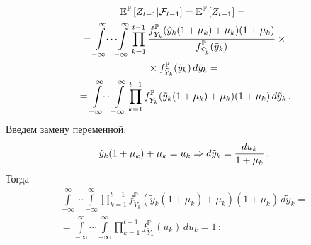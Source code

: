 \begin{multicols}{2}
\vspace{-12pt}

\noindent
\begin{multline*}
\mathbb{E}^{\mathbb{P}}\left[ Z_{t-1}\vert \mathcal{F}_{t-1}\right] 
=\mathbb{E}^{\mathbb{P}} \left[ Z_{t-1}\right]={}\\
{}=\int\limits_{-\infty}^\infty \!\!\cdots\!\! 
 \int\limits_{-\infty}^\infty  \prod\limits_{k=1}^{t-1} 
\fr{ f^{\mathbb{P}}_{\tilde{Y}_k}(\tilde{y}_k(1+\mu_k)+\mu_k)(1+\mu_k)} 
{f^{\mathbb{P}}_{\tilde{Y}_k}(\tilde{y}_k)}\times{}\\
{}\times f^{\mathbb{P}}_{\tilde{Y}_k}(\tilde{y}_k)\,d\tilde{y}_k={}\\
{}= \int\limits_{-\infty}^\infty \!\!\cdots\!\!  
\int\limits_{-\infty}^\infty \prod\limits_{k=1}^{t-1}
f^{\mathbb{P}}_{\tilde{Y}_k}(\tilde{y}_k(1+\mu_k)+\mu_k)(1+\mu_k)\,d\tilde{y}_k\,.
\end{multline*}
Введем замену переменной: 
$$
\tilde{y}_k(1+\mu_k)+\mu_k=u_k\Rightarrow d\tilde{y}_k=\displaystyle\frac{\displaystyle du_k\mathstrut}{\displaystyle 1+\mu_k\mathstrut}\,.
$$
 Тогда
\begin{multline*}
\int\limits^\infty_{-\infty}\!\!\cdots\!\!\int\limits^\infty_{-\infty} 
\prod\limits^{t-1}_{k=1} 
f^{\mathbb{P}}_{\tilde{Y}_k}\left( \tilde{y}_k(1+\mu_k) 
+\mu_k\right)(1+\mu_k)\,d\tilde{y}_k={}\\
{}= \int\limits^\infty_{-\infty}\!\!\cdots\!\! \int\limits^\infty_{-\infty} \prod\limits^{t-
1}_{k=1} f^{\mathbb{P}}_{\tilde{Y}_k} (u_k) \,du_k=1\,;
\end{multline*}

\vspace*{-12pt}


\end{multicols}
